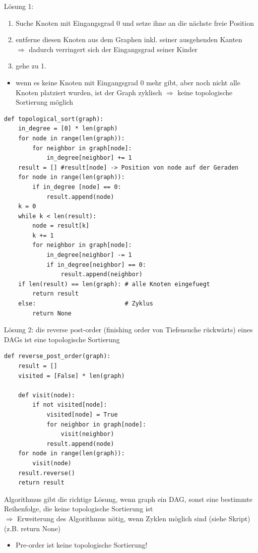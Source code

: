     Lösung 1:
    \begin{enumerate}
        \item Suche Knoten mit Eingangsgrad 0 und setze ihne an die nächste freie Position
        \item entferne diesen Knoten aus dem Graphen inkl. seiner ausgehenden Kanten\\
        $\Rightarrow$ dadurch verringert sich der Eingangsgrad seiner Kinder
        \item gehe zu 1.
    \end{enumerate}
    \begin{itemize}[label={}]
        \item wenn es keine Knoten mit Eingangsgrad 0 mehr gibt, aber noch nicht alle Knoten platziert wurden, ist der Graph zyklisch $\Rightarrow$ keine topologische Sortierung möglich
    \end{itemize}


    \begin{verbatim}
def topological_sort(graph):
    in_degree = [0] * len(graph)
    for node in range(len(graph)):
        for neighbor in graph[node]:
            in_degree[neighbor] += 1
    result = [] #result[node] -> Position von node auf der Geraden
    for node in range(len(graph)):
        if in_degree [node] == 0:
            result.append(node)
    k = 0
    while k < len(result):
        node = result[k]
        k += 1
        for neighbor in graph[node]:
            in_degree[neighbor] -= 1
            if in_degree[neighbor] == 0:
                result.append(neighbor)
    if len(result) == len(graph): # alle Knoten eingefuegt
        return result
    else:                         # Zyklus
        return None
    \end{verbatim}


    Lösung 2: die reverse post-order (finishing order von Tiefensuche rückwärts) eines DAGs ist eine topologische Sortierung

    \begin{verbatim}
def reverse_post_order(graph):
    result = []
    visited = [False] * len(graph)

    def visit(node):
        if not visited[node]:
            visited[node] = True
            for neighbor in graph[node]:
                visit(neighbor)
            result.append(node)
    for node in range(len(graph)):
        visit(node)
    result.reverse()
    return result
    \end{verbatim}

    Algorithmus gibt die richtige Lösung, wenn graph ein DAG, sonst eine bestimmte Reihenfolge, die keine topologische Sortierung ist\\
    $\Rightarrow$ Erweiterung des Algorithmus nötig, wenn Zyklen möglich sind (siehe Skript) (z.B. return None)
    \begin{itemize}
        \item Pre-order ist keine topologische Sortierung!
    \end{itemize}

